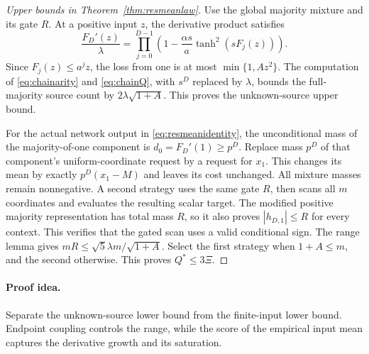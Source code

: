 \begin{proof}[Upper bounds in Theorem~\ref{thm:resmeanlaw}]
Use the global majority mixture and its gate $R$.
At a positive input $z$, the derivative product satisfies
\[
\frac{F_D'(z)}\lambda
=\prod_{j=0}^{D-1}\left(1-\frac{\alpha s}{a}
                       \tanh^2(sF_j(z))\right).
\]
Since $F_j(z)\le a^jz$, the loss from one is at most
$\min\{1,Az^2\}$. The computation of \eqref{eq:chainarity} and
\eqref{eq:chainQ}, with $s^D$ replaced by $\lambda$, bounds the
full-majority source count by $2\lambda\sqrt{1+A}$.
This proves the unknown-source upper bound.

For the actual network output in \eqref{eq:resmeanidentity}, the
unconditional mass of the majority-of-one component is
$d_0=F_D'(1)\ge p^D$.
Replace mass $p^D$ of that component's uniform-coordinate request
by a request for $x_1$. This changes its mean by exactly
$p^D(x_1-M)$ and leaves its cost unchanged.
All mixture masses remain nonnegative.
A second strategy uses the same gate $R$, then scans all $m$
coordinates and evaluates the resulting scalar target.
The modified positive majority representation has total mass
$R$, so it also proves $|h_{D,1}|\le R$ for every context.
This verifies that the gated scan uses a valid conditional sign.
The range lemma gives $mR\le\sqrt5\lambda m/\sqrt{1+A}$.
Select the first strategy when $1+A\le m$, and the second
otherwise. This proves $Q^*\le3\Xi$.
\end{proof}

\paragraph{Proof idea.}
Separate the unknown-source lower bound from the finite-input lower bound.
Endpoint coupling controls the range, while the score of the empirical input
mean captures the derivative growth and its saturation.

